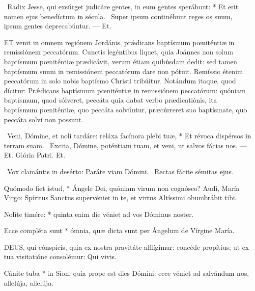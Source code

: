 \R\ Radix Jesse, qui exsúrget judicáre gentes, in eum gentes sperábunt: * Et erit nomen ejus benedíctum in sécula. \V\ Super ipsum continébunt reges os suum, ipsum gentes deprecabúntur. --- Et.


\lettrine[lines=2]{E}{T} venit in omnem regiónem Jordánis, prǽdicans baptísmum pœniténtiæ in remissiónem peccatórum. Cunctis legéntibus liquet, quia Joánnes non solum baptísmum pœniténtiæ prædicávit, verum étiam quibúsdam dedit: sed tamen baptísmum suum in remissiónem peccatórum dare non pótuit. Remíssio étenim peccatórum in solo nobis baptísmo Christi tribúitur. Notándum itaque, quod dícitur: Prǽdicans baptísmum pœniténtiæ in remissiónem peccatórum: quóniam baptísmum, quod sólveret, peccáta quia dabat verbo prædicatiónis, ita baptísmum pœniténtiæ, quo peccáta solvúntur, præcúrreret suo baptísmate, quo peccáta solvi non possunt.

\R\ Veni, Dómine, et noli tardáre: reláxa facínora plebi tuæ, * Et révoca dispérsos in terram suam. \V\ Excita, Dómine, poténtiam tuam, et veni, ut salvos fácias nos. --- Et. Glória Patri. Et.

\V\ Vox clamántis in desérto: Paráte viam Dómini. \R\ Rectas fácite sémitas ejus.

 Quómodo fiet istud, * Ángele Dei, quóniam virum non cognósco? Audi, María Virgo: Spíritus Sanctus supervéniet in te, et virtus Altíssimi obumbrábit tibi.


 Nolíte timére: * quinta enim die véniet ad vos Dóminus noster.


 Ecce compléta sunt * ómnia, quæ dicta sunt per Ángelum de Vírgine María.



\lettrine[lines=2]{D}{EUS}, qui cónspicis, quia ex nostra pravitáte afflígimur: concéde propítius; ut ex tua visitatióne consolémur: Qui vivis.



 Cánite tuba * in Sion, quia prope est dies Dómini: ecce véniet ad salvándum nos, allelúja, allelúja.

